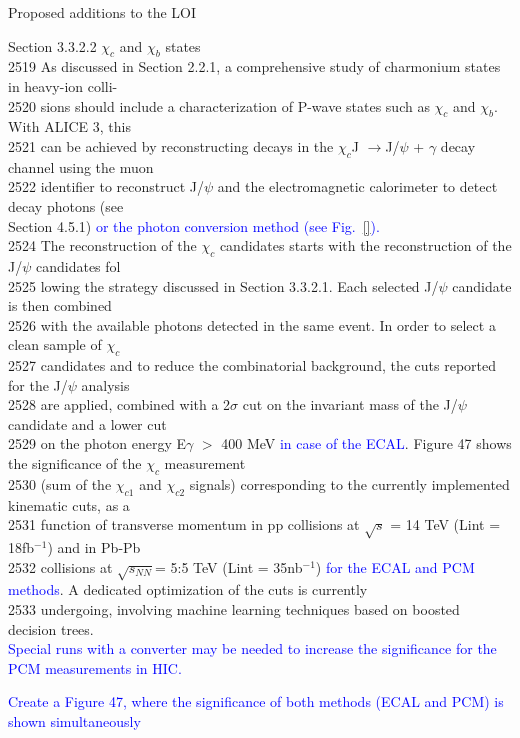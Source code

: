 \documentclass[final,hyperref={pdfpagelabels=false},aspectratio=169,t]{beamer}
\begin{document}
\begin{frame}{Proposed additions to the LOI}

{\tiny
Section 3.3.2.2 $\chi_c$ and $\chi_b$ states\\
2519 As discussed in Section 2.2.1, a comprehensive study of charmonium states in heavy-ion colli-  \\
2520 sions should include a characterization of P-wave states such as $\chi_c$ and $\chi_b$. With ALICE 3, this  \\
2521 can be achieved by reconstructing decays in the $\chi_c$J $\rightarrow$J/$\psi$ + $\gamma$ decay channel using the muon  \\
2522 identifier to reconstruct J/$\psi$ and the electromagnetic calorimeter to detect decay photons (see  \\
Section 4.5.1) \textcolor{blue}{or the photon conversion method (see Fig.~\ref{}).}\\


2524 The reconstruction of the $\chi_c$ candidates starts with the reconstruction of the J/$\psi$ candidates fol \\
2525 lowing the strategy discussed in Section 3.3.2.1. Each selected J/$\psi$ candidate is then combined\\
2526 with the available photons detected in the same event. In order to select a clean sample of $\chi_c$\\
2527 candidates and to reduce the combinatorial background, the cuts reported for the J/$\psi$ analysis\\
2528 are applied, combined with a 2$\sigma$ cut on the invariant mass of the J/$\psi$ candidate and a lower cut\\
2529 on the photon energy E$\gamma$ $>$ 400 MeV {\textcolor{blue}{in case of the ECAL}}. Figure 47 shows the significance of the $\chi_c$ measurement\\
2530 (sum of the $\chi_{c1}$ and $\chi_{c2}$ signals) corresponding to the currently implemented kinematic cuts, as a\\
2531 function of transverse momentum in pp collisions at $\sqrt{s}$ = 14 TeV (Lint = 18fb$^{-1}$) and in Pb-Pb\\
2532 collisions at $\sqrt{s_{NN}} $= 5:5 TeV (Lint = 35nb$^{-1}$) {\textcolor{blue}{for the ECAL and PCM methods}}. A dedicated optimization of the cuts is currently\\
2533 undergoing, involving machine learning techniques based on boosted decision trees. \\
{\textcolor{blue}{Special runs with a converter may be needed to increase the significance for the PCM measurements in HIC.}}\\
}

\vspace{1cm}

\textcolor{blue}{\small Create a Figure 47, where the significance of both methods (ECAL and PCM) is shown simultaneously}
\end{frame}



\end{document}
